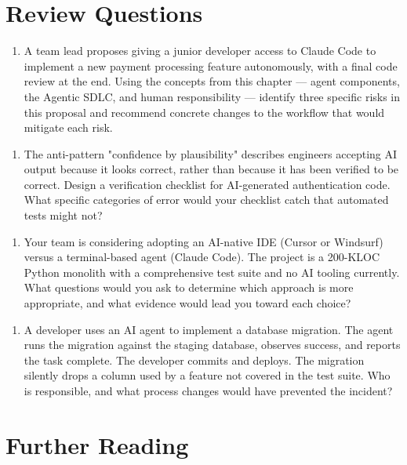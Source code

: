 \documentclass[11pt,a4paper]{book}
\begin{document}
\medskip

\section{Review Questions}

\begin{enumerate}
  \item A team lead proposes giving a junior developer access to Claude Code to implement a new payment processing feature autonomously, with a final code review at the end. Using the concepts from this chapter --- agent components, the Agentic SDLC, and human responsibility --- identify three specific risks in this proposal and recommend concrete changes to the workflow that would mitigate each risk.
\end{enumerate}

\begin{enumerate}
  \item The anti-pattern "confidence by plausibility" describes engineers accepting AI output because it looks correct, rather than because it has been verified to be correct. Design a verification checklist for AI-generated authentication code. What specific categories of error would your checklist catch that automated tests might not?
\end{enumerate}

\begin{enumerate}
  \item Your team is considering adopting an AI-native IDE (Cursor or Windsurf) versus a terminal-based agent (Claude Code). The project is a 200-KLOC Python monolith with a comprehensive test suite and no AI tooling currently. What questions would you ask to determine which approach is more appropriate, and what evidence would lead you toward each choice?
\end{enumerate}

\begin{enumerate}
  \item A developer uses an AI agent to implement a database migration. The agent runs the migration against the staging database, observes success, and reports the task complete. The developer commits and deploys. The migration silently drops a column used by a feature not covered in the test suite. Who is responsible, and what process changes would have prevented the incident?
\end{enumerate}

\medskip

\section{Further Reading}
\end{document}
